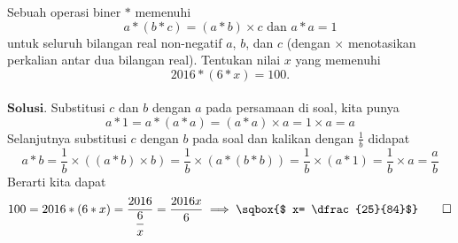 	
	Sebuah operasi biner $*$ memenuhi $$a*(b*c) = (a*b)\times c \text{  dan  } a*a = 1$$
	untuk seluruh bilangan real non-negatif $a$, $b$, dan $c$ (dengan $\times$ menotasikan perkalian antar dua bilangan real). Tentukan nilai $x$ yang memenuhi $$2016*(6*x)=100.$$\\
	\newpage
	$\textbf{Solusi.}$ Substitusi $c$ dan $b$ dengan $a$ pada persamaan di soal, kita punya
			$$a*1 = a*(a*a)=(a*a)\times a = 1 \times a = a$$
			Selanjutnya substitusi $c$ dengan $b$ pada soal dan kalikan dengan $\frac{1}{b}$ didapat
			$$ a*b= \frac{1}{b}\times((a*b)\times b) = \frac{1}{b}\times(a*(b*b))= \frac{1}{b}\times(a*1)=\frac{1}{b}\times a=\frac{a}{b}$$
			Berarti kita dapat
			$$100 = 2016*(6*x) = \dfrac{2016}{\dfrac{6}{x}}=\frac{2016x}{6} \implies \sqbox{$ x= \dfrac{25}{84}$} \qed$$
	
	
